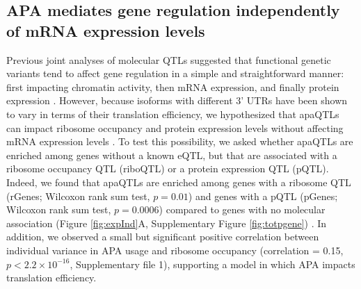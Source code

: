 \subsection{APA mediates gene regulation independently of mRNA expression levels}\label{APA-independent-expression}

Previous joint analyses of molecular QTLs suggested that functional genetic variants tend to affect gene regulation in a simple and straightforward manner: first impacting chromatin activity, then mRNA expression, and finally protein expression \citep{li_rna_2016, battle_genomic_2015}. However, because isoforms with different 3' UTRs have been shown to vary in terms of their translation efficiency, we hypothesized that apaQTLs can impact ribosome occupancy and protein expression levels without affecting mRNA expression levels \citep{floor_tunable_2016-1}. To test this possibility, we asked whether apaQTLs are enriched among genes without a known eQTL, but that are associated with a ribosome occupancy QTL (riboQTL) or a protein expression QTL (pQTL). Indeed, we found that apaQTLs are enriched among genes with a ribosome QTL (rGenes; Wilcoxon rank sum test, $p=0.01$) and genes with a pQTL (pGenes; Wilcoxon rank sum test, $p = 0.0006$) compared to genes with no molecular association (Figure \ref{fig:expInd}A, Supplementary Figure \ref{fig:totpgene}) \cite{li_rna_2016, battle_genomic_2015}. In addition, we observed a small but significant positive correlation between individual variance in APA usage and ribosome occupancy  (correlation = 0.15, $p <2.2\times10^{-16}$, Supplementary file 1), supporting a model in which APA impacts translation efficiency.

